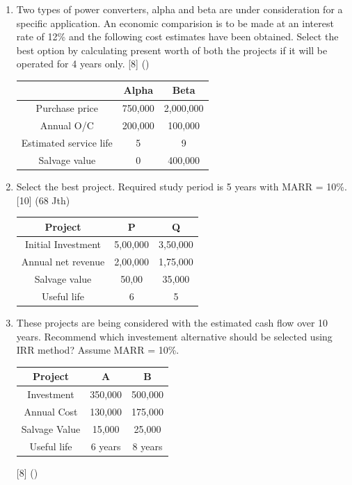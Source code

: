 \documentclass[12pt]{article}
\begin{document}
\begin{enumerate}
			\item Two types of power converters, alpha and beta are under consideration for a specific application. An economic comparision is to be made at an interest rate of 12\% and the following cost estimates have been obtained. Select the best option by calculating present worth of both the projects if it will be operated for 4 years only. \hfill [8] ()\\
			\begin{tabular}{|c|c|c|}
				\hline
				& Alpha & Beta \\ \hline
				Purchase price & 750,000 & 2,000,000 \\ \hline
				Annual O/C & 200,000 & 100,000 \\ \hline
				Estimated service life & 5 & 9 \\ \hline
				Salvage value & 0 & 400,000 \\ \hline
			\end{tabular}
			
			\item Select the best project. Required study period is 5 years with MARR = 10\%. \hfill [10] (68 Jth)
			\begin{tabular}{|c|c|c|}
				\hline
				Project & P & Q \\ \hline
				Initial Investment & 5,00,000 & 3,50,000 \\ \hline
				Annual net revenue & 2,00,000 & 1,75,000 \\ \hline
				Salvage value & 50,00 & 35,000 \\ \hline
				Useful life & 6 & 5 \\ \hline
			\end{tabular}

			\item These projects are being considered with the estimated cash flow over 10 years. Recommend which investement alternative should be selected using IRR method? Assume MARR = 10\%. 
			\begin{tabular}{|c|c|c|}
				\hline
				Project & A & B \\ \hline
				Investment & 350,000 & 500,000 \\ \hline
				Annual Cost & 130,000 & 175,000 \\ \hline
				Salvage Value & 15,000 & 25,000 \\ \hline
				Useful life & 6 years & 8 years \\ \hline
			\end{tabular} \hfill [8] ()


\end{enumerate}
\end{document}
